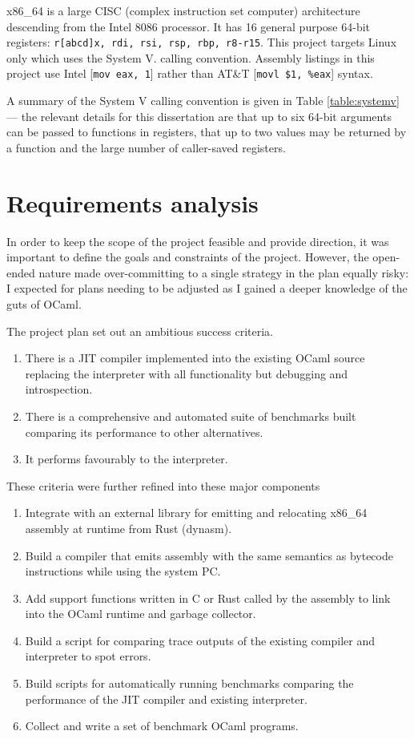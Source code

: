 x86\_64 is a large CISC (complex instruction set computer) architecture descending from the Intel
8086 processor.
It has 16 general purpose 64-bit registers: \texttt{r[abcd]x, rdi, rsi, rsp, rbp, r8-r15}.
This
project targets Linux only which uses the System V.
calling convention. Assembly listings in this project use Intel
    [\texttt{mov eax, 1}] rather than AT\&T [\texttt{movl
    \$1, \%eax}] syntax.

A summary of the System V calling convention is given in Table \ref{table:systemv} --- the relevant
details for this dissertation are
that up to six 64-bit arguments can be passed to functions in registers, that up to two values may
be returned by a
function
and the large number of caller-saved registers.

\section{Requirements analysis}

In order to keep the scope of the project feasible and provide direction, it was important to
define
the goals and constraints of the project. However, the open-ended nature made over-committing to a
single strategy in the plan equally risky: I expected for plans needing to be adjusted as I gained
a
deeper knowledge of the guts of OCaml.

The project plan set out an ambitious success criteria.

\begin{enumerate}
    \item There is a JIT compiler implemented into the existing OCaml source
          replacing the interpreter with all functionality but debugging
          and introspection.
    \item There is a comprehensive and automated suite of benchmarks built
          comparing its performance to other alternatives.
    \item It performs favourably to the interpreter.
\end{enumerate}

These criteria were further refined into these major components

\begin{enumerate}
    \item Integrate with an external library for emitting and relocating
          x86\_64 assembly at runtime from Rust (dynasm).
    \item Build a compiler that emits assembly with the same semantics as
          bytecode instructions while using the system PC.
    \item Add support functions written in C or Rust called by the assembly
          to link into the OCaml runtime and garbage collector.
    \item Build a script for comparing trace outputs of the existing
          compiler and interpreter to spot errors.
    \item Build scripts for automatically running benchmarks comparing the
          performance of the JIT compiler and existing interpreter.
    \item Collect and write a set of benchmark OCaml programs.
\end{enumerate}


